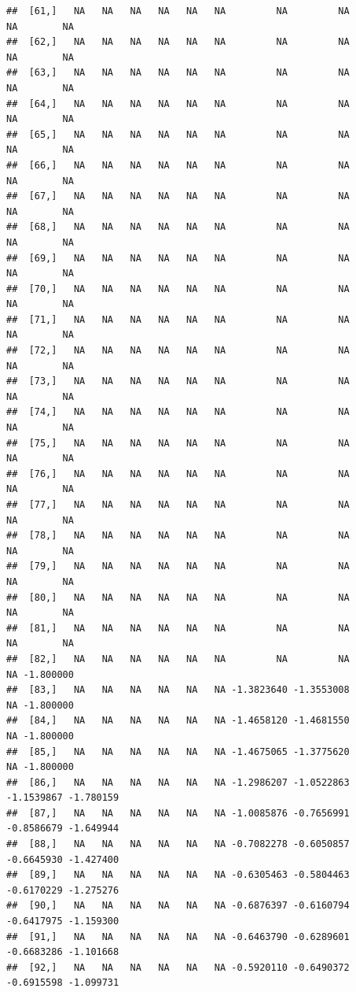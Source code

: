 \documentclass{article}\usepackage[]{graphicx}\usepackage[]{color}
\makeatletter
\newenvironment{kframe}{%
 \def\at@end@of@kframe{}%
 \ifinner\ifhmode%
  \def\at@end@of@kframe{\end{minipage}}%
  \begin{minipage}{\columnwidth}%
 \fi\fi%
 \def\FrameCommand##1{\hskip\@totalleftmargin \hskip-\fboxsep
 \colorbox{shadecolor}{##1}\hskip-\fboxsep
     \hskip-\linewidth \hskip-\@totalleftmargin \hskip\columnwidth}%
 \MakeFramed {\advance\hsize-\width
   \@totalleftmargin\z@ \linewidth\hsize
   \@setminipage}}%
 {\par\unskip\endMakeFramed%
 \at@end@of@kframe}
\newenvironment{knitrout}{}{} %
\makeatother
\begin{document}
\begin{knitrout}
\begin{kframe}
\begin{verbatim}
##  [61,]   NA   NA   NA   NA   NA   NA         NA         NA         NA        NA
##  [62,]   NA   NA   NA   NA   NA   NA         NA         NA         NA        NA
##  [63,]   NA   NA   NA   NA   NA   NA         NA         NA         NA        NA
##  [64,]   NA   NA   NA   NA   NA   NA         NA         NA         NA        NA
##  [65,]   NA   NA   NA   NA   NA   NA         NA         NA         NA        NA
##  [66,]   NA   NA   NA   NA   NA   NA         NA         NA         NA        NA
##  [67,]   NA   NA   NA   NA   NA   NA         NA         NA         NA        NA
##  [68,]   NA   NA   NA   NA   NA   NA         NA         NA         NA        NA
##  [69,]   NA   NA   NA   NA   NA   NA         NA         NA         NA        NA
##  [70,]   NA   NA   NA   NA   NA   NA         NA         NA         NA        NA
##  [71,]   NA   NA   NA   NA   NA   NA         NA         NA         NA        NA
##  [72,]   NA   NA   NA   NA   NA   NA         NA         NA         NA        NA
##  [73,]   NA   NA   NA   NA   NA   NA         NA         NA         NA        NA
##  [74,]   NA   NA   NA   NA   NA   NA         NA         NA         NA        NA
##  [75,]   NA   NA   NA   NA   NA   NA         NA         NA         NA        NA
##  [76,]   NA   NA   NA   NA   NA   NA         NA         NA         NA        NA
##  [77,]   NA   NA   NA   NA   NA   NA         NA         NA         NA        NA
##  [78,]   NA   NA   NA   NA   NA   NA         NA         NA         NA        NA
##  [79,]   NA   NA   NA   NA   NA   NA         NA         NA         NA        NA
##  [80,]   NA   NA   NA   NA   NA   NA         NA         NA         NA        NA
##  [81,]   NA   NA   NA   NA   NA   NA         NA         NA         NA        NA
##  [82,]   NA   NA   NA   NA   NA   NA         NA         NA         NA -1.800000
##  [83,]   NA   NA   NA   NA   NA   NA -1.3823640 -1.3553008         NA -1.800000
##  [84,]   NA   NA   NA   NA   NA   NA -1.4658120 -1.4681550         NA -1.800000
##  [85,]   NA   NA   NA   NA   NA   NA -1.4675065 -1.3775620         NA -1.800000
##  [86,]   NA   NA   NA   NA   NA   NA -1.2986207 -1.0522863 -1.1539867 -1.780159
##  [87,]   NA   NA   NA   NA   NA   NA -1.0085876 -0.7656991 -0.8586679 -1.649944
##  [88,]   NA   NA   NA   NA   NA   NA -0.7082278 -0.6050857 -0.6645930 -1.427400
##  [89,]   NA   NA   NA   NA   NA   NA -0.6305463 -0.5804463 -0.6170229 -1.275276
##  [90,]   NA   NA   NA   NA   NA   NA -0.6876397 -0.6160794 -0.6417975 -1.159300
##  [91,]   NA   NA   NA   NA   NA   NA -0.6463790 -0.6289601 -0.6683286 -1.101668
##  [92,]   NA   NA   NA   NA   NA   NA -0.5920110 -0.6490372 -0.6915598 -1.099731

\end{verbatim}
\end{kframe}
\end{knitrout}
\end{document}
